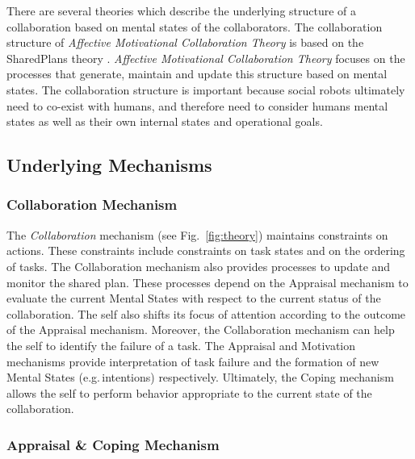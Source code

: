 There are several theories which describe the underlying structure of a
collaboration based on mental states of the collaborators. The collaboration
structure of \textit{Affective Motivational Collaboration Theory} is based on
the SharedPlans theory \cite{grosz:shared-plans}. \textit{Affective Motivational
Collaboration Theory} focuses on the processes that generate, maintain and
update this structure based on mental states. The collaboration structure is
important because social robots ultimately need to co-exist with humans, and
therefore need to consider humans mental states as well as their own internal
states and operational goals.

\subsection{Underlying Mechanisms}
\label{sec:mechanisms}

\subsubsection{Collaboration Mechanism}

The \textit{Collaboration} mechanism (see Fig.~\ref{fig:theory}) maintains
constraints on actions. These constraints include constraints on task states and
on the ordering of tasks. The Collaboration mechanism also provides processes to
update and monitor the shared plan. These processes depend on the Appraisal
mechanism to evaluate the current Mental States with respect to the current
status of the collaboration. The self also shifts its focus of attention
according to the outcome of the Appraisal mechanism. Moreover, the Collaboration
mechanism can help the self to identify the failure of a task. The Appraisal and
Motivation mechanisms provide interpretation of task failure and the formation
of new Mental States (e.g.\,intentions) respectively. Ultimately, the Coping
mechanism allows the self to perform behavior appropriate to the current state
of the collaboration.

\subsubsection{Appraisal \& Coping Mechanism}

